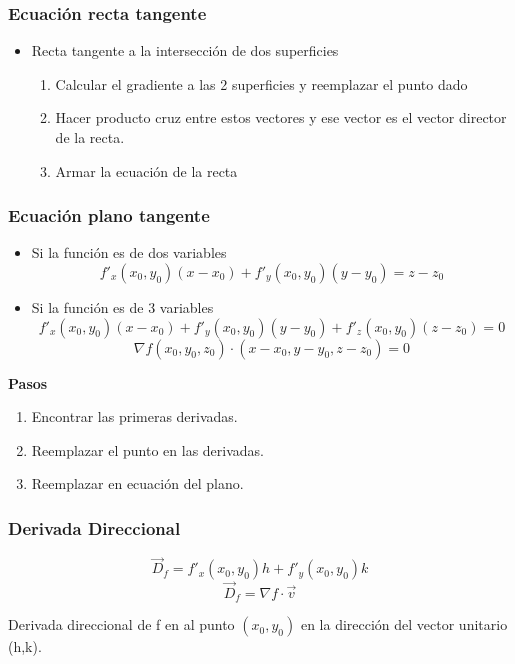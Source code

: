 \subsubsection{Ecuación recta tangente}

\begin{itemize}
	\item Recta tangente a la intersección de dos superficies
	\begin{enumerate}
		\item Calcular el gradiente a las 2 superficies y reemplazar el punto dado
		\item Hacer producto cruz entre estos vectores y ese vector es el vector director de la recta.
		\item Armar la ecuación de la recta
	\end{enumerate}
\end{itemize}


\subsubsection{Ecuación plano tangente}

\begin{itemize}
	\item Si la función es de dos variables
	$$f'_x(x_0,y_0)(x-x_0)+f'_y(x_0,y_0)(y-y_0)=z-z_0$$
	\item Si la función es de 3 variables
	$$f'_x(x_0,y_0)(x-x_0)+f'_y(x_0,y_0)(y-y_0)+f'_z(x_0,y_0)(z-z_0)=0$$
	$$\nabla f(x_0,y_0,z_0)\cdot(x-x_0,y-y_0,z-z_0)=0$$	
\end{itemize}




\textbf{Pasos}

\begin{enumerate}
	\item Encontrar las primeras derivadas.
	\item Reemplazar el punto en las derivadas.
	\item Reemplazar en ecuación del plano.
\end{enumerate}

\subsubsection{Derivada Direccional}

$$\overrightarrow{D}_f=f'_x(x_0,y_0)h+f'_y(x_0,y_0)k$$
$$\overrightarrow{D}_f=\nabla f \cdot \overrightarrow{v}$$

Derivada direccional de f en al punto $(x_0,y_0)$ en la dirección del vector unitario (h,k).

